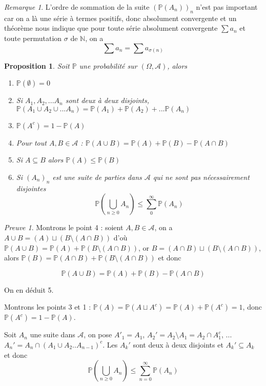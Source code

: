 \documentclass[]{article}
\newtheorem{myproposition}{Proposition}
\theoremstyle{remark}
\newtheorem{myrem}{Remarque}
\newtheorem{myproof}{Preuve}
\theoremstyle{definition}
\newcommand{\prob}[1]{\mathbb{P}\left(#1\right)}
\begin{document}
\begin{myrem}
	L'ordre de sommation de la suite $(\prob{A_n})_n$ n'est pas important car on a là une série à termes positifs, donc absolument convergente et un théorème nous indique que pour toute série absolument convergente $\sum a_n$ et toute permutation $\sigma$ de $\mathbb{N}$, on a $$\sum a_n = \sum a_{\sigma(n)}$$
\end{myrem}

\begin{myproposition}
	Soit $\mathbb{P}$ une probabilité sur $(\Omega, \mathcal{A})$, alors
	\begin{enumerate}
		\item $\mathbb{P}(\emptyset) = 0$
		\item Si $A_1, A_2, ... A_n$ sont deux à deux disjoints, $\mathbb{P}(A_1 \cup A_2 \cup ... A_n) = \mathbb{P}(A_1) + \mathbb{P}(A_2) + ... \mathbb{P}(A_n)$
		\item $\mathbb{P}(A^c) = 1 - \mathbb{P}(A)$
		\item Pour tout $A, B \in \mathcal{A}$ : $\mathbb{P}(A \cup B) = \mathbb{P}(A) + \mathbb{P}(B) - \mathbb{P}(A \cap B)$
		\item Si $A \subseteq B$ alors $\mathbb{P}(A) \leqslant \mathbb{P}(B)$
		\item Si $(A_n)_n$ est une suite de parties dans $\mathcal{A}$ qui ne sont pas nécessairement disjointes
		$$\mathbb{P}\left(\bigcup_{n \geqslant 0} A_n\right) \leqslant \sum_{0}^{\infty} \mathbb{P}(A_n)$$
	\end{enumerate}
\end{myproposition}

\begin{myproof}
		\leavevmode

		Montrons le point 4 : soient $A, B \in \mathcal{A}$, on a $A \cup B = (A) \sqcup (B \setminus (A \cap B))$ d'où $\prob{A \cup B} = \prob{A} + \prob{B \setminus (A \cap B)}$, or $B = (A \cap B) \sqcup (B \setminus (A \cap B))$, alors $\prob{B} = \prob{A \cap B} + \prob{B \setminus (A \cap B)}$ et donc
		
		$$\prob{A \cup B} = \prob{A} + \prob{B} - \prob{A \cap B}$$
	
		On en déduit 5.
	
		Montrons les points 3 et 1 : $\prob{A} = \prob{A \sqcup A^c} = \prob{A} + \prob{A^c}  = 1$, donc $\prob{A^c} = 1 - \prob{A}$.
	
		Soit $A_n$ une suite dans $\mathcal{A}$, on pose $A'_1 = A_1$, $A_2' = A_2 \setminus A_1 = A_2 \cap A_1^c$, ... $A_n' = A_n \cap (A_1 \cup A_2 .. A_{n-1})^c$. Les $A_k'$ sont deux à deux disjoints et $A_k' \subseteq A_k$ et donc $$\prob{\bigcup_{n \geqslant 0} A_n} \leqslant \sum_{n = 0}^{\infty} \prob{A_n}$$
\end{myproof}
\end{document}
